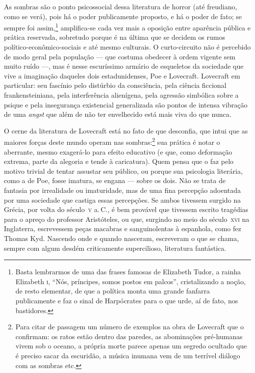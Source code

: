 As sombras são o ponto psicossocial dessa literatura de horror (até
freudiano, como se verá), pois há o poder publicamente proposto, e há o
poder de fato; se sempre foi assim,\footnote{Basta lembrarmos de
  uma das frases famosas de Elizabeth Tudor, a rainha
  Elizabeth \textsc{i}, %
  ``Nós,
  príncipes, somos postos em palcos'', cristalizando a noção, de resto
  elementar, de que a política monta uma grande fanfarra publicamente e
  faz o sinal de Harpócrates para o que urde, aí de fato, nos
  bastidores.} amplifica-se cada vez mais a oposição entre
aparência pública e prática reservada, sobretudo porque é
na última que se decidem os rumos político-econômico-sociais e até mesmo
culturais. O curto-circuito não é percebido de modo geral pela população
--- que costuma obedecer à ordem vigente sem muito ruído ---, mas é
nesse escuríssimo armário de esqueletos da sociedade que vive a
imaginação daqueles dois estadunidenses, Poe e Lovecraft. Lovecraft em
particular: seu fascínio pelo distúrbio da consciência, pela ciência
ficcional frankensteiniana, pela interferência alienígena, pela agressão
simbólica sobre a psique e pela insegurança existencial generalizada são
pontos de intensa vibração de uma \emph{angst} que além de não ter
envelhecido está mais viva do que nunca.

O cerne da literatura de Lovecraft está no fato de que desconfia,
que intui que as maiores forças deste mundo operam nas sombras:\footnote{Para
  citar de passagem um número de exemplos na obra de Lovecraft que o
  confirmam: os ratos estão dentro das paredes, as abominações
  pré-humanas vivem sob o oceano, a própria morte parece apenas um
  segredo ocultado que é preciso sacar da escuridão, a música inumana
  vem de um terrível diálogo com as sombras etc.} sua prática é notar o aberrante, mesmo exagerá-lo para efeito educativo (e que,
como deformação extrema, parte da alegoria e tende à caricatura). Quem
pensa que o faz pelo motivo trivial de tentar assustar seu público, ou
porque sua psicologia literária, como a de Poe, fosse imatura, se engana
--- sobre os dois. Não se trata de fantasia por irrealidade ou
imaturidade, mas de uma fina percepção adoentada por uma sociedade que
castiga essas percepções. Se ambos tivessem surgido na Grécia, por volta do
século~\textsc{v} a.\,C., é bem provável que tivessem escrito tragédias para o
apreço do professor Aristóteles, ou que, surgindo no meio do século~\textsc{xvi}
na Inglaterra, escrevessem peças macabras e sanguinolentas à espanhola,
como fez Thomas Kyd. Nascendo onde e quando nasceram, escreveram o que
se chama, sempre com algum desdém criticamente supercilioso,
literatura fantástica.


